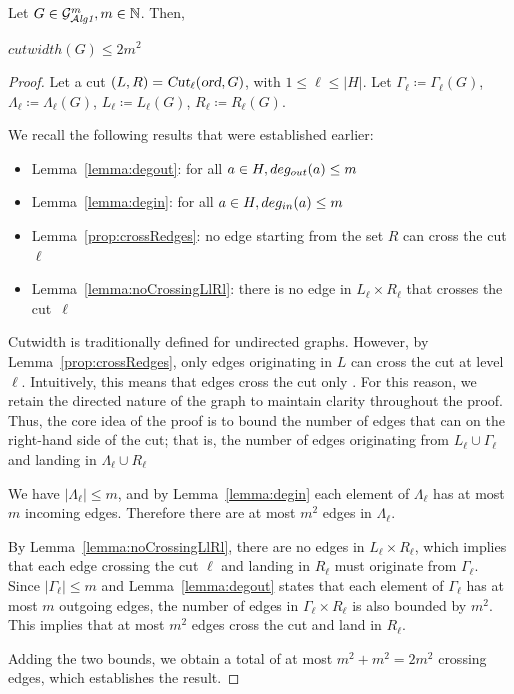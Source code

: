 \documentclass[12pt]{article}
\begin{document}
\begin{theorem}\label{thm:cutwidthBounded}
Let \mbox{$G\in\mathcal{G}_{\mathcal{A}\emph{lg1}}^m,m\in\mathbb{N}$}. Then,
\begin{center}
$cutwidth(G)\leq 2m^2$
\end{center}
\end{theorem}
\begin{proof}

Let a cut \mbox{$(L,R)=\textsl{Cut}_\ell(\textsl{ord},G)$}, with \mbox{$1\leq\ell\leq|H|$}. Let \mbox{$\Gamma_\ell\coloneq\Gamma_\ell(G)$}, \mbox{$\Lambda_\ell\coloneq\Lambda_\ell(G)$}, \mbox{$L_\ell\coloneq L_\ell(G)$}, \mbox{$R_\ell\coloneq R_\ell(G)$}.


We recall the following results that were established earlier:
\begin{itemize}[label=$\ast$,itemsep=0pt,parsep=0pt]
	\item Lemma~\ref{lemma:degout}: for all $a\in H, deg_{out}(a) \leq m$
	\item Lemma~\ref{lemma:degin}: for all $a\in H,deg_{in}(a)\leq m$
	\item Lemma~\ref{prop:crossRedges}: no edge starting from the set $R$ can cross the cut $\ell$
	\item Lemma~\ref{lemma:noCrossingLlRl}: there is no edge in $L_\ell\times R_\ell$ that crosses the cut~$\ell$
\end{itemize}

Cutwidth is traditionally defined for undirected graphs. However, by Lemma~\ref{prop:crossRedges}, only edges originating in $L$ can cross the cut at level $\ell$. Intuitively, this means that edges cross the cut only . For this reason, we retain the directed nature of the graph to maintain clarity throughout the proof. Thus, the core idea of the proof is to bound the number of edges that can  on the right-hand side of the cut; that is, the number of edges originating from $L_\ell\cup\Gamma_\ell$ and landing in $\Lambda_\ell\cup R_\ell$
 
We have $|\Lambda_\ell| \leq m$, and by Lemma~\ref{lemma:degin} each element of $\Lambda_\ell$ has at most $m$ incoming edges. Therefore there are at most $m^2$ edges  in $\Lambda_\ell$.

By Lemma~\ref{lemma:noCrossingLlRl}, there are no edges in $L_\ell\times R_\ell$, which implies that each edge crossing the cut $\ell$ and landing in $R_\ell$ must originate from $\Gamma_\ell$. Since $|\Gamma_\ell| \leq m$ and Lemma~\ref{lemma:degout} states that each element of $\Gamma_\ell$ has at most $m$ outgoing edges, the number of edges in $\Gamma_\ell\times R_\ell$ is also bounded by $m^2$. This implies that at most $m^2$ edges cross the cut and land in $R_\ell$.

Adding the two bounds, we obtain a total of at most $m^2+m^2=2m^2$ crossing edges, which establishes the result.

\end{proof}
\end{document}
